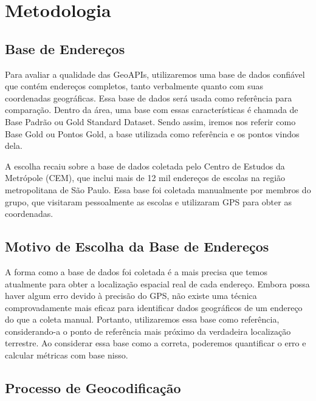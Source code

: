\documentclass{article}
\begin{document}
\section{Metodologia}

\subsection{Base de Endereços}
Para avaliar a qualidade das GeoAPIs, utilizaremos uma base de dados confiável que contém endereços completos, tanto verbalmente quanto com suas coordenadas geográficas. Essa base de dados será usada como referência para comparação. Dentro da área, uma base com essas características é chamada de Base Padrão ou Gold Standard Dataset. Sendo assim, iremos nos referir como Base Gold ou Pontos Gold, a base utilizada como referência e os pontos vindos dela.  

A escolha recaiu sobre a base de dados coletada pelo Centro de Estudos da Metrópole (CEM), que inclui mais de 12 mil endereços de escolas na região metropolitana de São Paulo. Essa base foi coletada manualmente por membros do grupo, que visitaram pessoalmente as escolas e utilizaram GPS para obter as coordenadas.

\subsection{Motivo de Escolha da Base de Endereços}
A forma como a base de dados foi coletada é a mais precisa que temos atualmente para obter a localização espacial real de cada endereço. Embora possa haver algum erro devido à precisão do GPS, não existe uma técnica comprovadamente mais eficaz para identificar dados geográficos de um endereço do que a coleta manual. Portanto, utilizaremos essa base como referência, considerando-a o ponto de referência mais próximo da verdadeira localização terrestre. Ao considerar essa base como a correta, poderemos quantificar o erro e calcular métricas com base nisso.

\subsection{Processo de Geocodificação}
\end{document}
